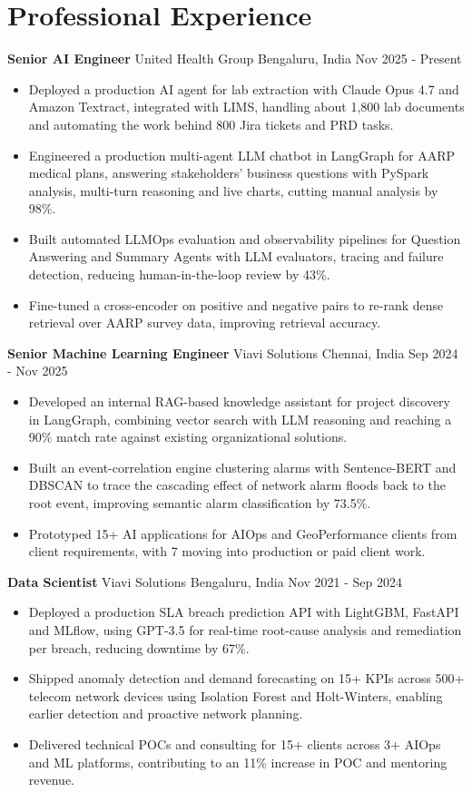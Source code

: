 \documentclass[10pt,a4paper]{article}
\newcommand{\role}[4]{\textbf{#1} \textbar{} #2 \hfill #3 \textbar{} #4\par}
\begin{document}
\section{Professional Experience}
\role{Senior AI Engineer}{United Health Group}{Bengaluru, India}{Nov 2025 - Present}
\begin{itemize}
  \item Deployed a production AI agent for lab extraction with Claude Opus 4.7 and Amazon Textract, integrated with LIMS, handling about 1,800 lab documents and automating the work behind 800 Jira tickets and PRD tasks.
  \item Engineered a production multi-agent LLM chatbot in LangGraph for AARP medical plans, answering stakeholders' business questions with PySpark analysis, multi-turn reasoning and live charts, cutting manual analysis by 98\%.
  \item Built automated LLMOps evaluation and observability pipelines for Question Answering and Summary Agents with LLM evaluators, tracing and failure detection, reducing human-in-the-loop review by 43\%.
  \item Fine-tuned a cross-encoder on positive and negative pairs to re-rank dense retrieval over AARP survey data, improving retrieval accuracy.
\end{itemize}
\vspace{3pt}
\role{Senior Machine Learning Engineer}{Viavi Solutions}{Chennai, India}{Sep 2024 - Nov 2025}
\begin{itemize}
  \item Developed an internal RAG-based knowledge assistant for project discovery in LangGraph, combining vector search with LLM reasoning and reaching a 90\% match rate against existing organizational solutions.
  \item Built an event-correlation engine clustering alarms with Sentence-BERT and DBSCAN to trace the cascading effect of network alarm floods back to the root event, improving semantic alarm classification by 73.5\%.
  \item Prototyped 15+ AI applications for AIOps and GeoPerformance clients from client requirements, with 7 moving into production or paid client work.
\end{itemize}
\vspace{3pt}
\role{Data Scientist}{Viavi Solutions}{Bengaluru, India}{Nov 2021 - Sep 2024}
\begin{itemize}
  \item Deployed a production SLA breach prediction API with LightGBM, FastAPI and MLflow, using GPT-3.5 for real-time root-cause analysis and remediation per breach, reducing downtime by 67\%.
  \item Shipped anomaly detection and demand forecasting on 15+ KPIs across 500+ telecom network devices using Isolation Forest and Holt-Winters, enabling earlier detection and proactive network planning.
  \item Delivered technical POCs and consulting for 15+ clients across 3+ AIOps and ML platforms, contributing to an 11\% increase in POC and mentoring revenue.
\end{itemize}
\end{document}
